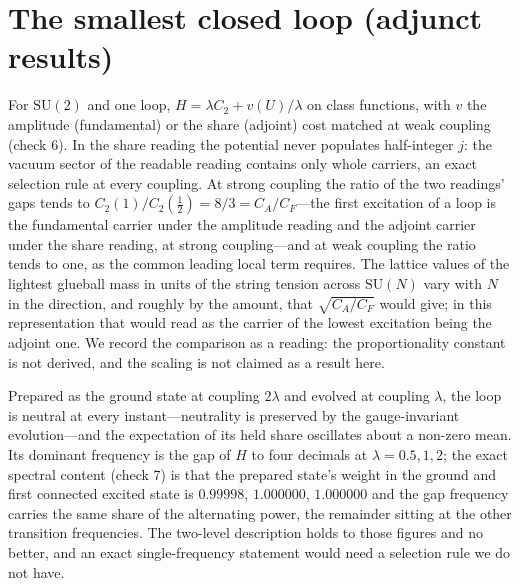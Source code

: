 \documentclass[11pt,a4paper]{article}
\theoremstyle{plain}
\theoremstyle{definition}
\theoremstyle{remark}
\newcommand{\SU}{\mathrm{SU}}
\begin{document}
\section{The smallest closed loop (adjunct results)}\label{app:loop}

For $\SU(2)$ and one loop, $H=\lambda C_2+v(U)/\lambda$ on class functions, with $v$ the amplitude (fundamental) or the share (adjoint) cost matched at weak coupling (check 6). In the share reading the potential never populates half-integer $j$: the vacuum sector of the readable reading contains only whole carriers, an exact selection rule at every coupling. At strong coupling the ratio of the two readings' gaps tends to $C_2(1)/C_2(\tfrac12)=8/3=C_A/C_F$---the first excitation of a loop is the fundamental carrier under the amplitude reading and the adjoint carrier under the share reading, at strong coupling---and at weak coupling the ratio tends to one, as the common leading local term requires. The lattice values of the lightest glueball mass in units of the string tension across $\SU(N)$ \cite{lt,teper} vary with $N$ in the direction, and roughly by the amount, that $\sqrt{C_A/C_F}$ would give; in this representation that would read as the carrier of the lowest excitation being the adjoint one. We record the comparison as a reading: the proportionality constant is not derived, and the scaling is not claimed as a result here.

Prepared as the ground state at coupling $2\lambda$ and evolved at coupling $\lambda$, the loop is neutral at every instant---neutrality is preserved by the gauge-invariant evolution---and the expectation of its held share oscillates about a non-zero mean. Its dominant frequency is the gap of $H$ to four decimals at $\lambda=0.5,1,2$; the exact spectral content (check 7) is that the prepared state's weight in the ground and first connected excited state is $0.99998$, $1.000000$, $1.000000$ and the gap frequency carries the same share of the alternating power, the remainder sitting at the other transition frequencies. The two-level description holds to those figures and no better, and an exact single-frequency statement would need a selection rule we do not have.
\end{document}
